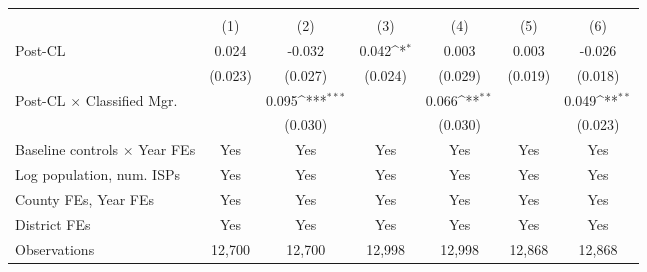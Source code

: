 {
\def\sym#1{\ifmmode^{#1}\else\(^{#1}\)\fi}
\begin{tabular}{l*{6}{c}}
\toprule
                    &&&\\\cmidrule(lr){2-3}\cmidrule(lr){4-5}\cmidrule(lr){6-7}
                    &         &         &         &         &         &         \\
\midrule
Post-CL             &       0.024         &      -0.032         &       0.042\sym{*}  &       0.003         &       0.003         &      -0.026         \\
                    &     (0.023)         &     (0.027)         &     (0.024)         &     (0.029)         &     (0.019)         &     (0.018)         \\
\addlinespace
Post-CL $\times$ Classified Mgr.&                     &       0.095\sym{***}&                     &       0.066\sym{**} &                     &       0.049\sym{**} \\
                    &                     &     (0.030)         &                     &     (0.030)         &                     &     (0.023)         \\
\addlinespace
Baseline controls $\times$ Year FEs &         Yes         &         Yes         &         Yes         &         Yes         &         Yes         &         Yes         \\
\addlinespace
Log population, num. ISPs &         Yes         &         Yes         &         Yes         &         Yes         &         Yes         &         Yes         \\
\addlinespace
County FEs, Year FEs &         Yes         &         Yes         &         Yes         &         Yes         &         Yes         &         Yes         \\
\addlinespace
District FEs        &         Yes         &         Yes         &         Yes         &         Yes         &         Yes         &         Yes         \\
\midrule
Observations        &      12,700         &      12,700         &      12,998         &      12,998         &      12,868         &      12,868         \\

\end{tabular}}
